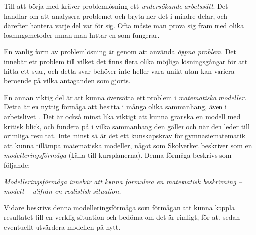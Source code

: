 
\noindent \textcolor{lila}{
    Till att börja med kräver problemlösning ett \textsl{undersökande arbetssätt}. Det handlar om att analysera problemet och bryta ner det i mindre delar, och därefter hantera varje del var för sig. Ofta måste man prova sig fram med olika lösningsmetoder innan man hittar en som fungerar.
}
        
\textcolor{lila}{
    En vanlig form av problemlösning är genom att använda \textsl{öppna problem}. Det innebär ett  problem till vilket det finns flera olika möjliga lösningsgångar för att hitta ett svar, och detta svar behöver inte heller vara unikt utan kan variera beroende på vilka antaganden som gjorts.
}

\textcolor{lila}{
    En annan viktig del är att kunna översätta ett problem i \textsl{matematiska modeller}. Detta är en nyttig förmåga att besitta i många olika sammanhang, även i arbetslivet~\cite{TheElephant}. Det är också minst lika viktigt att kunna granska en modell med kritisk blick, och fundera på i vilka sammanhang den gäller och när den leder till orimliga resultat.
}
\textcolor{Mahogany}{Inte minst så är det ett kunskapskrav för gymnasiematematik att kunna tillämpa matematiska modeller, något som Skolverket beskriver som en \textsl{modelleringsförmåga} \cite{ProblemDef} (källa till kursplanerna). Denna förmåga beskrivs som följande:}

\begin{displayquote}
    \textcolor{Mahogany}{
        \textsl{Modelleringsförmåga innebär att kunna formulera en matematisk beskrivning – modell – utifrån en realistisk situation.}
    }
\end{displayquote}
\noindent\textcolor{Mahogany}{Vidare beskrivs denna modelleringsförmåga som förmågan att kunna koppla resultatet till en verklig situation och bedöma om det är rimligt, för att sedan eventuellt utvärdera modellen på nytt.}

